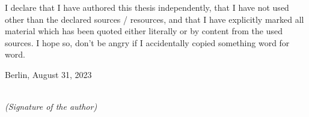\newpage
\thispagestyle{empty}

\begin{large}

\vspace*{2cm}

\noindent
I declare that I have authored this thesis independently, that I have not used other than the declared sources / resources, and that I have explicitly marked all material which has been quoted either literally or by content from the used sources. I hope so, don't be angry if I accidentally copied something word for word.

\vspace{2cm}

\noindent
Berlin, August 31, 2023
\vspace{3cm}

\hspace*{7cm}%
\dotfill\\
\hspace*{8.5cm}%
\textit{(Signature of the author)}

\end{large}
